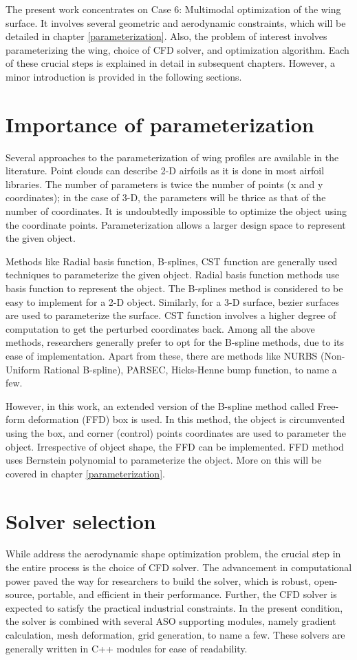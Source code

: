 The present work concentrates on Case 6: Multimodal optimization of the wing surface. It involves several geometric and aerodynamic constraints, which will be detailed in chapter \ref{parameterization}. Also, the problem of interest involves parameterizing the wing, choice of CFD solver, and optimization algorithm. Each of these crucial steps is explained in detail in subsequent chapters. However, a minor introduction is provided in the following sections.

\section{Importance of parameterization }
Several approaches to the parameterization of wing profiles are available in the literature. Point clouds can describe 2-D airfoils as it is done in most airfoil libraries. The number of parameters is twice the number of points (x and y coordinates); in the case of 3-D, the parameters will be thrice as that of the number of coordinates. It is undoubtedly impossible to optimize the object using the coordinate points. Parameterization allows a larger design space to represent the given object.

Methods like Radial basis function, B-splines, CST function are generally used techniques to parameterize the given object. Radial basis function methods use basis function to represent the object. The B-splines method is considered to be easy to implement for a 2-D object. Similarly, for a 3-D surface, bezier surfaces are used to parameterize the surface. CST function involves a higher degree of computation to get the perturbed coordinates back. Among all the above methods, researchers generally prefer to opt for the B-spline methods, due to its ease of implementation. Apart from these, there are methods like NURBS (Non-Uniform Rational B-spline), PARSEC, Hicks-Henne bump function, to name a few.

However, in this work, an extended version of the B-spline method called Free-form deformation (FFD) box is used. In this method, the object is circumvented using the box, and corner (control) points coordinates are used to parameter the object. Irrespective of object shape, the FFD can be implemented. FFD method uses Bernstein polynomial to parameterize the object. More on this will be covered in chapter \ref{parameterization}.
\section{Solver selection}
While address the aerodynamic shape optimization problem, the crucial step in the entire process is the choice of CFD solver. The advancement in computational power paved the way for researchers to build the solver, which is robust, open-source, portable, and efficient in their performance. Further, the CFD solver is expected to satisfy the practical industrial constraints. In the present condition, the solver is combined with several ASO supporting modules, namely gradient calculation, mesh deformation, grid generation, to name a few. These solvers are generally written in C++ modules for ease of readability.

